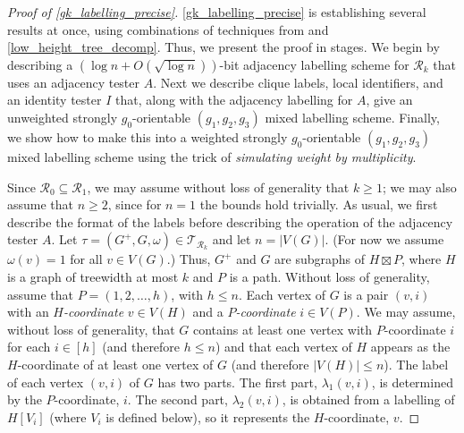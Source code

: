 \documentclass{patmorin}
\renewcommand{\ge}{\geqslant}
\renewcommand{\le}{\leqslant}
\newcommand{\defin}[1]{\emph{\textcolor{brightmaroon}{#1}}}
\newcommand{\calR}{\mathcal{R}}
\newcommand{\calT}{\mathcal{T}}
\begin{document}
\begin{proof}[Proof of \cref{gk_labelling_precise}]
  \cref{gk_labelling_precise} is establishing several results at once, using combinations of techniques from \cite{dujmovic.esperet.ea:adjacency,gawrychowski.janczewski:simpler,EJM23} and \cref{low_height_tree_decomp}.  Thus, we present the proof in stages.
  We begin by describing a $(\log n+O(\sqrt{\log n}))$-bit adjacency labelling scheme for $\calR_k$ that uses an adjacency tester $A$.  Next we describe clique labels, local identifiers, and an identity tester $I$ that, along with the adjacency labelling for $A$, give an unweighted strongly $g_0$-orientable $(g_1,g_2,g_3)$ mixed labelling scheme.  Finally, we show how to make this into a weighted strongly $g_0$-orientable $(g_1,g_2,g_3)$ mixed labelling scheme using the trick of \emph{simulating weight by multiplicity}.

  Since $\calR_0\subseteq\calR_1$, we may assume without loss of generality that $k\ge 1$; we may also assume that $n\ge 2$, since for $n=1$ the bounds hold trivially.
  As usual, we first describe the format of the labels before describing the operation of the adjacency tester $A$. Let $\tau=(G^+,G,\omega)\in\calT_{\calR_k}$ and let $n=|V(G)|$. (For now we assume $\omega(v)=1$ for all $v\in V(G)$.) Thus, $G^+$ and $G$ are subgraphs of $H\boxtimes P$, where $H$ is a graph of treewidth at most $k$ and $P$ is a path. Without loss of generality, assume that $P=(1,2,\dots,h)$, with $h\le n$.  Each vertex of $G$ is a pair $(v,i)$ with an \defin{$H$-coordinate} $v\in V(H)$ and a \defin{$P$-coordinate} $i\in V(P)$. We may assume, without loss of generality, that $G$ contains at least one vertex with $P$-coordinate $i$ for each $i\in[h]$ (and therefore $h\le n$) and that each vertex of $H$ appears as the $H$-coordinate of at least one vertex of $G$ (and therefore $|V(H)|\le n$). The label of each vertex $(v,i)$ of $G$ has two parts. The first part, $\lambda_1(v,i)$, is determined by the $P$-coordinate, $i$. The second part, $\lambda_2(v,i)$, is obtained from a labelling of $H[V_i]$ (where $V_i$ is defined below), so it represents the $H$-coordinate, $v$.


\end{proof}
\end{document}
